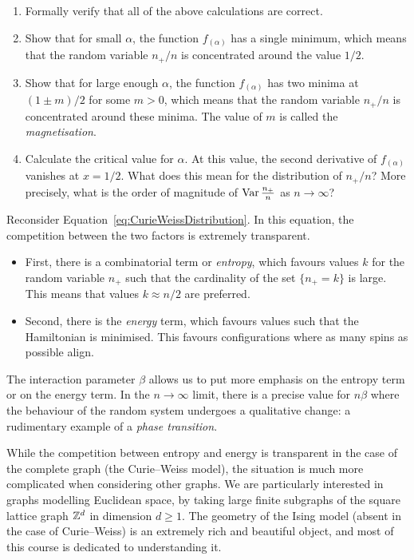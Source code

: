 \begin{exercise}
    \begin{enumerate}
        \item Formally verify that all of the above calculations are correct.
        \item Show that for small $\alpha$, the function \( f_{(\alpha)} \) has a single minimum, which means that the random variable \( n_+/n \) is concentrated around the value \( 1/2 \).
        \item Show that for large enough $\alpha$, the function \( f_{(\alpha)} \) has two minima at \( (1 \pm m)/2 \) for some $m>0$, which means that the random variable \( n_+/n \) is concentrated around these minima.
        The value of $m$ is called the \emph{magnetisation}.
        \item Calculate the critical value for $\alpha$. At this value, the second derivative of \( f_{(\alpha)} \) vanishes at \( x=1/2 \). What does this mean for the distribution of \( n_+/n \)?
        More precisely, what is the order of magnitude of $\operatorname{Var}\frac{n_+}{n}$ as $n\to\infty$?
    \end{enumerate}
\end{exercise}

\begin{remark}
    Reconsider Equation~\eqref{eq:CurieWeissDistribution}.
    In this equation, the competition between the two factors is extremely transparent.
    \begin{itemize}
        \item     First, there is a combinatorial term or \emph{entropy}, which favours values $k$ for the random variable
        $n_+$ such that the cardinality of the set $\{n_+=k\}$ is large.
        This means that values $k\approx n/2$ are preferred.
        \item     Second, there is the \emph{energy} term, which favours values such that the Hamiltonian 
        is minimised. This favours configurations where as many spins as possible align.    
    \end{itemize}
    The interaction parameter $\beta$ allows us to put more emphasis
    on the entropy term or on the energy term.
    In the $n\to\infty$ limit, there is a precise value for $n\beta$
    where the behaviour of the random system undergoes a qualitative change:
    a rudimentary example of a  \emph{phase transition}.
\end{remark}

While the competition between entropy and energy is transparent in the
case of the complete graph (the Curie--Weiss model), the situation is much more
complicated when considering other graphs.
We are particularly interested in graphs modelling Euclidean space,
by taking large finite subgraphs of the square lattice graph $\mathbb Z^d$
in dimension $d\geq 1$.
The geometry of the Ising model (absent in the case of Curie--Weiss)
is an extremely rich and beautiful object,
and most of this course is dedicated to understanding it.
